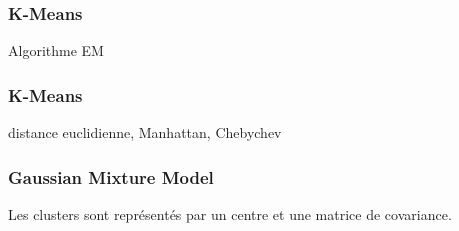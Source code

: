 \begin{frame}
  \frametitle{K-Means}
  Algorithme EM
\end{frame}

\begin{frame}
  \frametitle{K-Means}
  distance euclidienne, Manhattan, Chebychev
\end{frame}

\begin{frame}
  \frametitle{Gaussian Mixture Model}
  Les clusters sont représentés par un centre et une matrice de covariance.
\end{frame}
